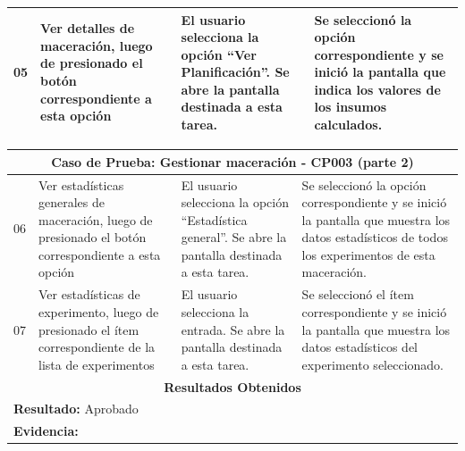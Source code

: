 \begin{minipage}{0.95\textwidth}
\begin{center}
\begin{tabularx}{\textwidth}{ | p{2cm} | X | X | X |}
        \hline
        05 & Ver detalles de maceración, luego de presionado el botón correspondiente a esta opción & El usuario selecciona la opción ``Ver Planificación''. Se abre la pantalla destinada a esta tarea.& Se seleccionó la opción correspondiente y se inició la pantalla que indica los valores de los insumos calculados.\\
        \hline
        \end{tabularx}
        \label{CP003-p1}
        \end{center}
        \end{minipage}
        
        \begin{minipage}{0.95\textwidth}
        \begin{center}
        \begin{tabularx}{\textwidth}{ | p{2cm} | X | X | X |}
        \hline
        \multicolumn{4}{|c|}{\textbf{Caso de Prueba: Gestionar maceración - CP003 (parte 2)}} \\
        \hline
        06 & Ver estadísticas generales de maceración, luego de presionado el botón correspondiente a esta opción & El usuario selecciona la opción ``Estadística general''. Se abre la pantalla destinada a esta tarea.& Se seleccionó la opción correspondiente y se inició la pantalla que muestra los datos estadísticos de todos los experimentos de esta maceración.\\
        \hline
        07 & Ver estadísticas de experimento, luego de presionado el ítem correspondiente de la lista de experimentos & El usuario selecciona la entrada. Se abre la pantalla destinada a esta tarea.& Se seleccionó el ítem correspondiente y se inició la pantalla que muestra los datos estadísticos del experimento seleccionado.\\
        \hline
        \multicolumn{4}{|c|}{\textbf{Resultados Obtenidos}} \\
        \hline
        \multicolumn{4}{|l|}{\textbf{Resultado:} Aprobado} \\
        \hline
        \multicolumn{4}{|l|}{\textbf{Evidencia: }} \\
        \hline
     \end{tabularx}
    \label{CP003-p2}
    \end{center}
    \end{minipage}
    
